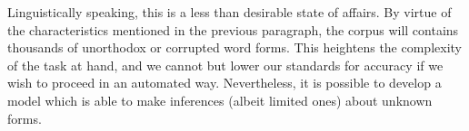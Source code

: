 Linguistically speaking, this is a less than desirable state of
affairs. By virtue of the characteristics mentioned in the previous
paragraph, the corpus will contains thousands of unorthodox or
corrupted word forms. This heightens the complexity of the task at
hand, and we cannot but lower our standards for accuracy if we wish to
proceed in an automated way. Nevertheless, it is possible to develop a
model which is able to make inferences (albeit limited ones) about
unknown forms.





